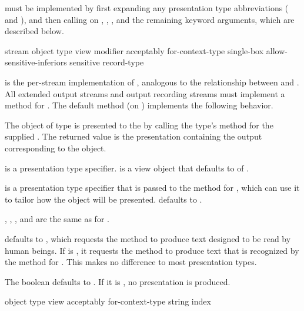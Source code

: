  must be implemented by first expanding any presentation type
abbreviations ( and ), and then calling
 on , , , and the remaining
keyword arguments, which are described below.

 {stream object type
                              \key view modifier acceptably for-context-type
                                   single-box allow-sensitive-inferiors sensitive 
                                   record-type}

 is the per-stream implementation of , analogous
to the relationship between  and .  All
extended output streams and output recording streams must implement a method for
.  The default method (on
) implements the following behavior.

The object  of type  is presented to the 
 by calling the type's  method for the supplied
 .  The returned value is the presentation containing the
output corresponding to the object.

 is a presentation type specifier.   is a view object that
defaults to  of .

 is a presentation type specifier that is passed to the
 method for , which can use it to tailor how the object
will be presented.   defaults to .

, , , and
 are the same as for .

 defaults to , which requests the  method to
produce text designed to be read by human beings.  If  is
, it requests the  method to produce text that is recognized
by the  method for .  This makes no difference
to most presentation types.

The boolean  defaults to .  If it is , no
presentation is produced.


 {object \optional type
                            \key view acceptably for-context-type string index}

